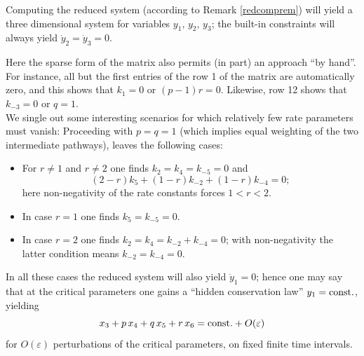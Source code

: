 \documentclass{article}
\begin{document}
Computing the reduced system (according to Remark \ref{redcomprem}) will yield a three dimensional system for variables $y_1,\,y_2,\, y_3$; the built-in constraints will always yield $\dot y_2=\dot y_3=0$.


Here the sparse form of the matrix also permits (in part) an approach ``by hand''. For instance, all but the first entries of the row 1 of the matrix are automatically zero, and this shows that $k_1=0$ or $(p-1)r=0$. Likewise, row 12 shows that $k_{-3}=0$ or $q=1$.\\
We single out some interesting scenarios for which relatively few rate parameters must vanish: Proceeding with $p=q=1$
(which implies equal weighting of the two intermediate pathways), 
leaves the following cases:
\begin{itemize}
    \item For $r\neq 1$ and $r\neq 2$ one finds $k_{2}=k_{4}=k_{-5}=0$ and
    \[
    (2-r)k_5+(1-r)k_{-2}+(1-r)k_{-4}=0;
    \]
    here non-negativity of the rate constants forces $1<r<2.$
    \item In case $r=1$ one finds $k_5=k_{-5}=0$.
    \item In case $r=2$ one finds $k_{2}=k_{4}=k_{-2}+k_{-4}=0$; with non-negativity the latter condition means $k_{-2}=k_{-4}=0$.
\end{itemize}
In all these cases the reduced system will also yield $\dot y_1=0$; hence one may say that at the critical parameters one gains a ``hidden conservation law'' $y_1={\rm const.}$, yielding 
\[
x_3 + p\, x_4 + q\, x_5 + r\, x_6={\rm const.}+O(\varepsilon)
\]
for $O(\varepsilon)$ perturbations of the critical parameters, on fixed finite time intervals.
\end{document}
